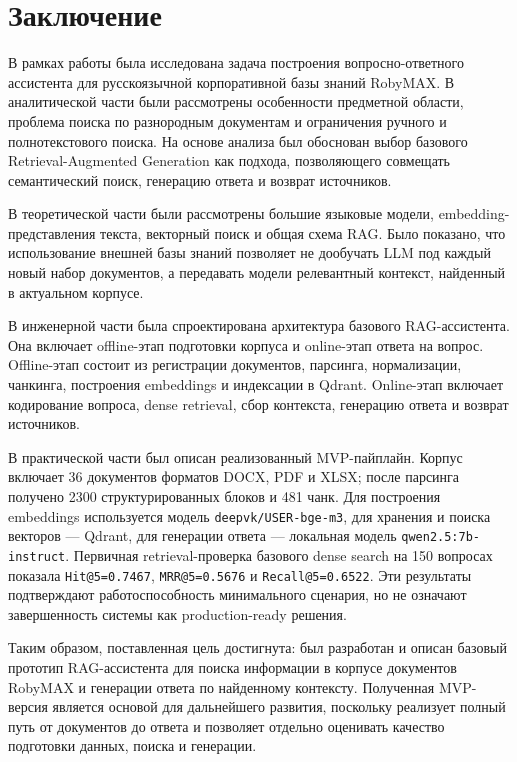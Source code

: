 \chapter*{Заключение}

В рамках работы была исследована задача построения вопросно-ответного ассистента для русскоязычной корпоративной базы знаний RobyMAX. В аналитической части были рассмотрены особенности предметной области, проблема поиска по разнородным документам и ограничения ручного и полнотекстового поиска. На основе анализа был обоснован выбор базового Retrieval-Augmented Generation как подхода, позволяющего совмещать семантический поиск, генерацию ответа и возврат источников.

В теоретической части были рассмотрены большие языковые модели, embedding-представления текста, векторный поиск и общая схема RAG. Было показано, что использование внешней базы знаний позволяет не дообучать LLM под каждый новый набор документов, а передавать модели релевантный контекст, найденный в актуальном корпусе.

В инженерной части была спроектирована архитектура базового RAG-ассистента. Она включает offline-этап подготовки корпуса и online-этап ответа на вопрос. Offline-этап состоит из регистрации документов, парсинга, нормализации, чанкинга, построения embeddings и индексации в Qdrant. Online-этап включает кодирование вопроса, dense retrieval, сбор контекста, генерацию ответа и возврат источников.

В практической части был описан реализованный MVP-пайплайн. Корпус включает 36 документов форматов DOCX, PDF и XLSX; после парсинга получено 2300 структурированных блоков и 481 чанк. Для построения embeddings используется модель \texttt{deepvk/USER-bge-m3}, для хранения и поиска векторов — Qdrant, для генерации ответа — локальная модель \texttt{qwen2.5:7b-instruct}. Первичная retrieval-проверка базового dense search на 150 вопросах показала \texttt{Hit@5=0.7467}, \texttt{MRR@5=0.5676} и \texttt{Recall@5=0.6522}. Эти результаты подтверждают работоспособность минимального сценария, но не означают завершенность системы как production-ready решения.

Таким образом, поставленная цель достигнута: был разработан и описан базовый прототип RAG-ассистента для поиска информации в корпусе документов RobyMAX и генерации ответа по найденному контексту. Полученная MVP-версия является основой для дальнейшего развития, поскольку реализует полный путь от документов до ответа и позволяет отдельно оценивать качество подготовки данных, поиска и генерации.

